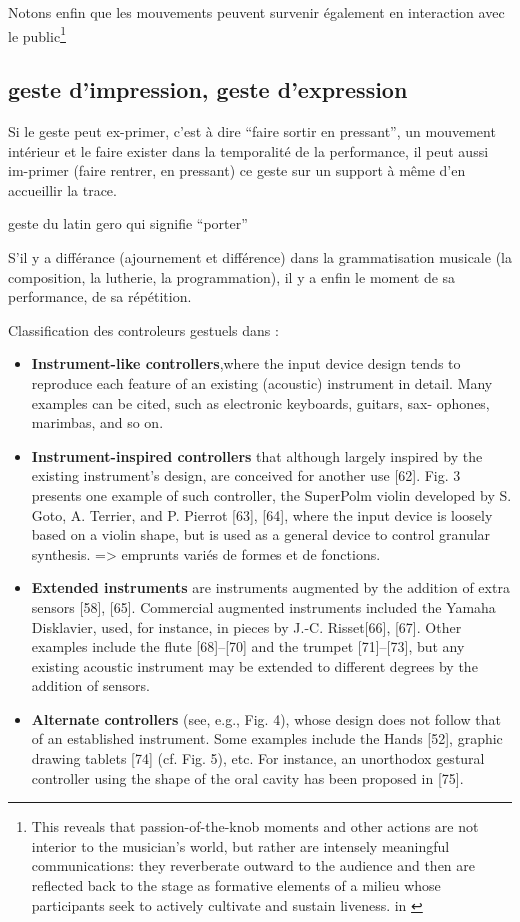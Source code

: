 Notons enfin que les mouvements peuvent survenir également en interaction avec le public\footnote{This reveals that passion-of-the-knob moments and other actions are not interior to the musician’s world, but rather are intensely meaningful communications: they reverberate outward to the audience and then are reflected back to the stage as formative elements of a milieu whose participants seek to actively cultivate and sustain liveness. in \cite{butler_playing_2014}} 



\subsection*{geste d'impression, geste d'expression}
Si le geste peut ex-primer, c'est à dire ``faire sortir en pressant'', un mouvement intérieur et le faire exister dans la temporalité de la performance, il peut aussi im-primer (faire rentrer, en pressant) ce geste sur un support à même d'en accueillir la trace.

geste du latin gero qui signifie ``porter''

S'il y a différance (ajournement et différence) dans la grammatisation musicale (la composition, la lutherie, la programmation), il y a enfin le moment de sa performance, de sa répétition.

Classification des controleurs gestuels dans \cite{wanderley_controgestuel_1999}:
\vspace{-1em}
\begin{itemize}[noitemsep]
\item \textbf{Instrument-like controllers},where the input device design tends to reproduce each feature of an existing (acoustic) instrument in detail. Many examples can be cited, such as electronic keyboards, guitars, sax- ophones, marimbas, and so on.
\item \textbf{Instrument-inspired controllers} that although largely inspired by the existing instrument’s design, are conceived for another use [62]. Fig. 3 presents one example of such controller, the SuperPolm violin developed by S. Goto, A. Terrier, and P. Pierrot [63], [64], where the input device is loosely based on a violin shape, but is used as a general device to control granular synthesis. => emprunts variés de formes et de fonctions.
\item \textbf{Extended instruments} are instruments augmented by the addition of extra sensors [58], [65]. Commercial augmented instruments included the Yamaha Disklavier, used, for instance, in pieces by J.-C. Risset[66], [67]. Other examples include the flute [68]–[70] and the trumpet [71]–[73], but any existing acoustic instrument may be extended to different degrees by the addition of sensors.
\item \textbf{Alternate controllers} (see, e.g., Fig. 4), whose design does not follow that of an established instrument. Some examples include the Hands [52], graphic drawing tablets [74] (cf. Fig. 5), etc. For instance, an unorthodox gestural controller using the shape of the oral cavity has been proposed in [75].
\end{itemize}

